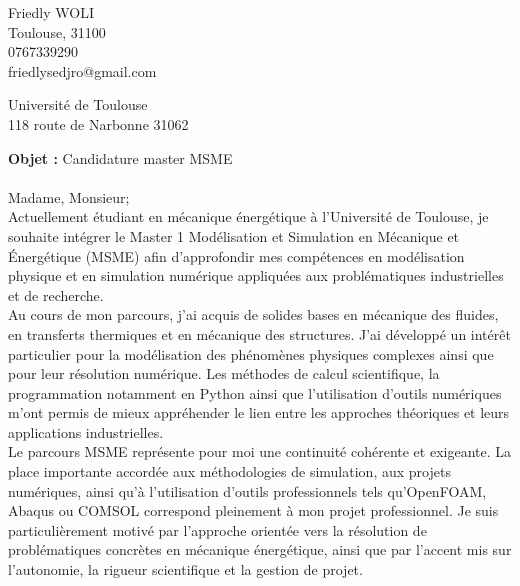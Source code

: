 \documentclass[11pt,a4paper]{article}
\begin{document}
	\pagestyle{empty}
	
	\noindent
	Friedly WOLI \\  %
	Toulouse, 31100  \\
	0767339290 \\
	friedlysedjro@gmail.com 
	
	\begin{flushright}
		
		Université de Toulouse \\
		118 route de Narbonne 31062 
	\end{flushright}
	

	\bigskip






			\textbf{Objet :} Candidature master MSME \\ \\
			Madame, Monsieur;\\
			
			Actuellement étudiant en mécanique énergétique à l’Université de Toulouse, je souhaite intégrer le Master 1 Modélisation et Simulation en Mécanique et Énergétique (MSME) afin d’approfondir mes compétences en modélisation physique et en simulation numérique appliquées aux problématiques industrielles et de recherche.\\
			
			Au cours de mon parcours, j’ai acquis de solides bases en mécanique des fluides, en transferts thermiques et en mécanique des structures. J’ai développé un intérêt particulier pour la modélisation des phénomènes physiques complexes ainsi que pour leur résolution numérique. Les méthodes de calcul scientifique, la programmation notamment en Python ainsi que l’utilisation d’outils numériques m’ont permis de mieux appréhender le lien entre les approches théoriques et leurs applications industrielles.\\
			
			Le parcours MSME représente pour moi une continuité cohérente et exigeante. La place importante accordée aux méthodologies de simulation, aux projets numériques, ainsi qu’à l’utilisation d’outils professionnels tels qu’OpenFOAM, Abaqus ou COMSOL correspond pleinement à mon projet professionnel. Je suis particulièrement motivé par l’approche orientée vers la résolution de problématiques concrètes en mécanique énergétique, ainsi que par l’accent mis sur l’autonomie, la rigueur scientifique et la gestion de projet.\\
			
\end{document}
